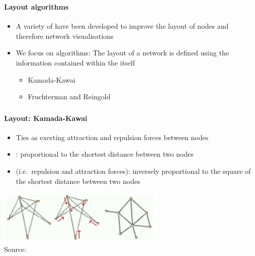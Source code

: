 \documentclass[8pt]{beamer}
\begin{document}

\begin{frame}
\frametitle{\insertsection}
\framesubtitle{Layout algorithms}


\begin{itemize}
\item A variety of {\color{blue}{layout algorithms}} have been developed to improve the layout of nodes and therefore network visualisations
\item We focus on {\color{blue}{force-directed}} algorithms: The layout of a network is defined using the information contained within the {\color{blue}{structure of the network}} itself

    \begin{itemize}
    \item Kamada-Kawai
    \item Fruchterman and Reingold
    \end{itemize}
    
\end{itemize}

\vspace{0.5cm}




\end{frame}

\begin{frame}
\frametitle{\insertsection}
\framesubtitle{Layout: Kamada-Kawai}


{}
    \begin{itemize}
    \item Ties as {\color{blue}{springs}} exerting attraction and repulsion forces between nodes
    \item {\color{blue}{Length of spring}}: proportional to the shortest distance between two nodes
    \item {\color{blue}{Strength of the spring}} (i.e.\ repulsion and attraction forces): inversely proportional to the square of the shortest distance between two nodes
    \end{itemize}

\medskip
\medskip

\centering
\includegraphics[width=8cm]{spring}\\
\tiny{Source: \cite{Kobourov2012}}

\end{frame}
\end{document}
